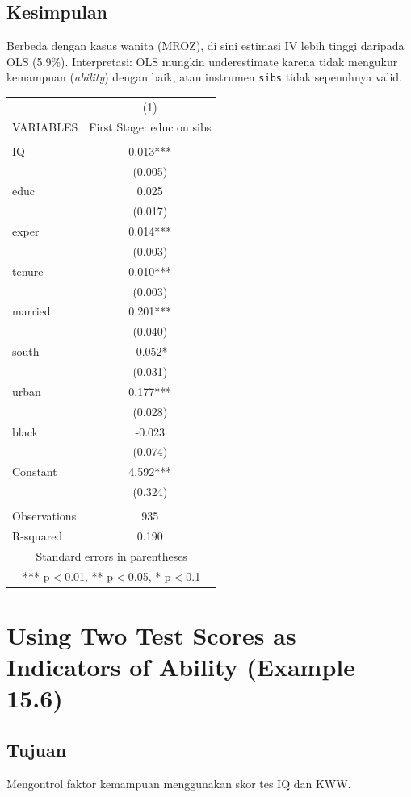 \documentclass[]{article}
\begin{document}
\subsection*{Kesimpulan}
Berbeda dengan kasus wanita (MROZ), di sini estimasi IV lebih tinggi daripada OLS (5.9\%).
Interpretasi: OLS mungkin underestimate karena tidak mengukur kemampuan (\textit{ability}) dengan baik, atau instrumen \texttt{sibs} tidak sepenuhnya valid.
\newpage
\begin{tabular}{lc} \hline
 & (1) \\
VARIABLES & First Stage: educ on sibs \\ \hline
 &  \\
IQ & 0.013*** \\
 & (0.005) \\
educ & 0.025 \\
 & (0.017) \\
exper & 0.014*** \\
 & (0.003) \\
tenure & 0.010*** \\
 & (0.003) \\
married & 0.201*** \\
 & (0.040) \\
south & -0.052* \\
 & (0.031) \\
urban & 0.177*** \\
 & (0.028) \\
black & -0.023 \\
 & (0.074) \\
Constant & 4.592*** \\
 & (0.324) \\
 &  \\
Observations & 935 \\
 R-squared & 0.190 \\ \hline
\multicolumn{2}{c}{ Standard errors in parentheses} \\
\multicolumn{2}{c}{ *** p$<$0.01, ** p$<$0.05, * p$<$0.1} \\
\end{tabular}
\section{Using Two Test Scores as Indicators of Ability (Example 15.6)}
\subsection*{Tujuan}
Mengontrol faktor kemampuan menggunakan skor tes IQ dan KWW.
\end{document}
